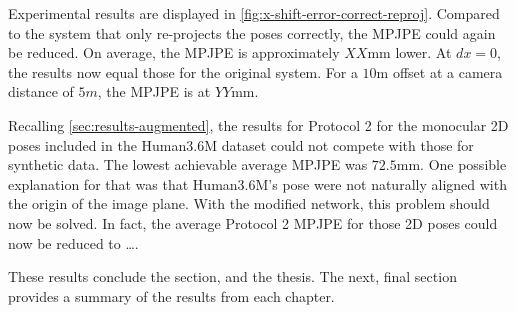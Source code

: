 Experimental results are displayed in \autoref{fig:x-shift-error-correct-reproj}.
Compared to the system that only re-projects the poses correctly, the MPJPE could again be reduced.
On average, the MPJPE is approximately $XX$mm lower.
At $dx = 0$, the results now equal those for the original system.
For a $10$m offset at a camera distance of $5m$, the MPJPE is at $YY$mm.

Recalling \autoref{sec:results-augmented}, the results for Protocol 2 for the monocular 2D poses included in the Human3.6M dataset could not compete with those for synthetic data.
The lowest achievable average MPJPE was $72.5$mm.
One possible explanation for that was that Human3.6M's pose were not naturally aligned with the origin of the image plane.
With the modified network, this problem should now be solved.
In fact, the average Protocol 2 MPJPE for those 2D poses could now be reduced to \dots.

These results conclude the section, and the thesis.
The next, final section provides a summary of the results from each chapter.
